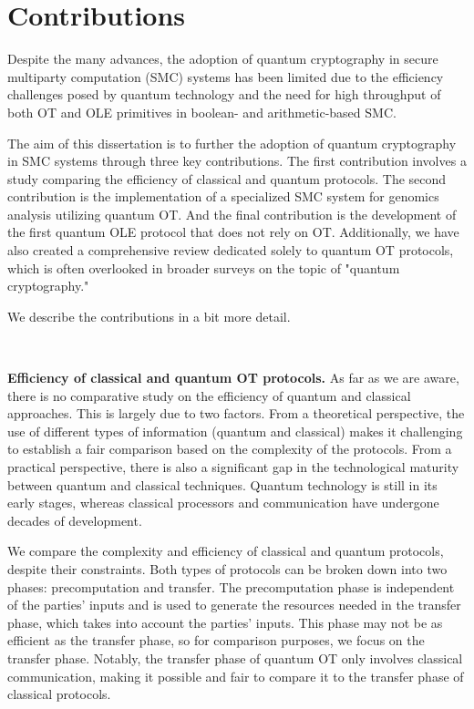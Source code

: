 \section*{Contributions} %

Despite the many advances, the adoption of quantum cryptography in secure multiparty computation (SMC) systems has been limited due to the efficiency challenges posed by quantum technology and the need for high throughput of both OT and OLE primitives in boolean- and arithmetic-based SMC.

The aim of this dissertation is to further the adoption of quantum cryptography in SMC systems through three key contributions. The first contribution involves a study comparing the efficiency of classical and quantum protocols. The second contribution is the implementation of a specialized SMC system for genomics analysis utilizing quantum OT. And the final contribution is the development of the first quantum OLE protocol that does not rely on OT. Additionally, we have also created a comprehensive review dedicated solely to quantum OT protocols, which is often overlooked in broader surveys on the topic of "quantum cryptography."

We describe the contributions in a bit more detail.

\

\noindent\textbf{Efficiency of classical and quantum OT protocols.} As far as we are aware, there is no comparative study on the efficiency of quantum and classical approaches. This is largely due to two factors. From a theoretical perspective, the use of different types of information (quantum and classical) makes it challenging to establish a fair comparison based on the complexity of the protocols. From a practical perspective, there is also a significant gap in the technological maturity between quantum and classical techniques. Quantum technology is still in its early stages, whereas classical processors and communication have undergone decades of development.


We compare the complexity and efficiency of classical and quantum protocols, despite their constraints. Both types of protocols can be broken down into two phases: precomputation and transfer. The precomputation phase is independent of the parties' inputs and is used to generate the resources needed in the transfer phase, which takes into account the parties' inputs. This phase may not be as efficient as the transfer phase, so for comparison purposes, we focus on the transfer phase. Notably, the transfer phase of quantum OT only involves classical communication, making it possible and fair to compare it to the transfer phase of classical protocols.


